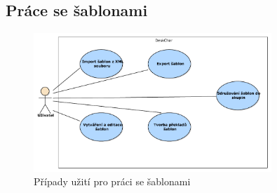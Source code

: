 \documentclass[thesis=B,czech]{resources/FITthesis}[2012/06/26]
\begin{document}
\subsection{Práce se šablonami}
	\begin{figure}\centering
		\includegraphics[width=0.8\textwidth]{images/usecase-sablony.pdf}
		\caption[Případy užití pro šablony]{Případy užití pro práci se šablonami}			\label{fig:uc_sablony}
	\end{figure}
\end{document}
